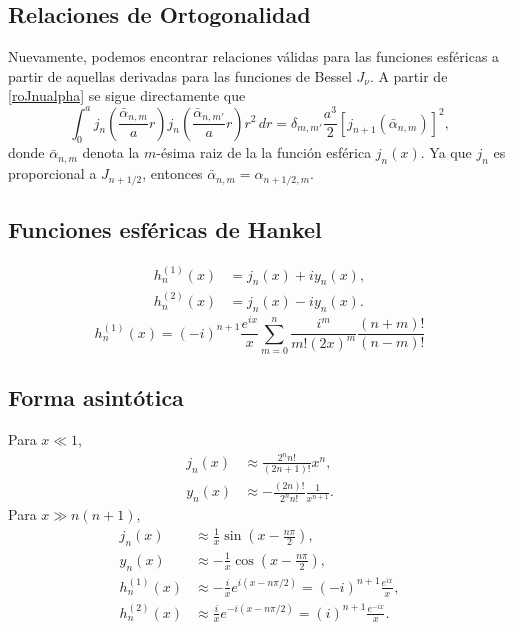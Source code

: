 \subsection{Relaciones de Ortogonalidad}
Nuevamente, podemos encontrar relaciones válidas para las funciones esféricas a partir de aquellas derivadas para las funciones de Bessel $J_\nu$. A partir de \eqref{roJnualpha} se sigue directamente que
\begin{equation}\label{rojnualpha}
\boxed{\int_0^a j_n\left(\frac{\bar{\alpha}_{n,m}}{a}r\right)j_n\left(\frac{\bar{\alpha}_{n,m'}}{a}r\right)r^2\,dr
=\delta_{m,m'}\frac{a^3}{2}\left[j_{n+1}(\bar{\alpha}_{n,m})\right]^2,}
\end{equation}
donde $\bar{\alpha}_{n,m}$ denota la $m$-ésima raiz de la la función esférica $j_n(x)$. Ya que $j_n$ es proporcional a $J_{n+1/2}$, entonces $\bar{\alpha}_{n,m}=\alpha_{n+1/2,m}$.


\subsection{Funciones esféricas de Hankel} 
\begin{align}
h_n^{(1)}(x) &= j_n(x) + i y_n(x) , \\
h_n^{(2)}(x) &= j_n(x) - i y_n(x).
\end{align}
\begin{equation}
h_n^{(1)}(x) = (-i)^{n+1} \frac{e^{ix}}{x} \sum_{m=0}^n \frac{i^m}{m!(2x)^m} \frac{(n+m)!}{(n-m)!}
\end{equation}

\subsection{Forma asintótica}
Para $x\ll 1$,
\begin{align}
j_n(x) &\approx \frac{2^nn!}{(2n+1)!}x^n, \\
y_n(x) &\approx -\frac{(2n)!}{2^nn!}\frac{1}{x^{n+1}}.
\end{align}
Para $x\gg n(n+1)$,
\begin{align}
j_n(x) &\approx \frac{1}{x}\sin\left(x-\frac{n\pi}{2}\right), \\
y_n(x) &\approx -\frac{1}{x}\cos\left(x-\frac{n\pi}{2}\right), \\
h^{(1)}_n(x) &\approx -\frac{i}{x}e^{i(x-{n\pi}/{2})}=(-i)^{n+1}\frac{e^{ix}}{x}, \\
h^{(2)}_n(x) &\approx \frac{i}{x}e^{-i(x-{n\pi}/{2})}=(i)^{n+1}\frac{e^{-ix}}{x}.
\end{align}

